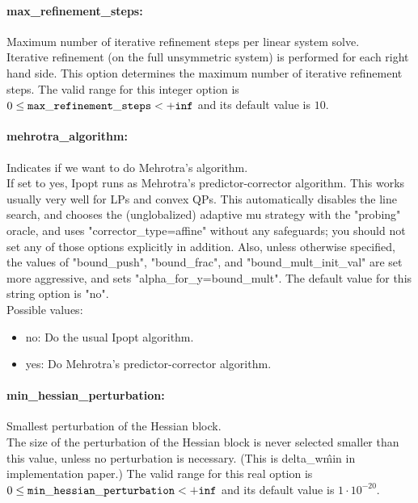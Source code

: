 \paragraph{max\_refinement\_steps:}\label{opt:max_refinement_steps} Maximum number of iterative refinement steps per linear system solve. \\
 Iterative refinement (on the full unsymmetric system) is performed for each right hand side.  This option determines the maximum number of iterative refinement steps. The valid range for this integer option is
$0 \le {\tt max\_refinement\_steps } <  {\tt +inf}$
and its default value is $10$.


\paragraph{mehrotra\_algorithm:}\label{opt:mehrotra_algorithm} Indicates if we want to do Mehrotra's algorithm. \\
 If set to yes, Ipopt runs as Mehrotra's predictor-corrector algorithm. This works usually very well for LPs and convex QPs.  This automatically disables the line search, and chooses the (unglobalized) adaptive mu strategy with the "probing" oracle, and uses "corrector\_type=affine" without any safeguards; you should not set any of those options explicitly in addition.  Also, unless otherwise specified, the values of "bound\_push", "bound\_frac", and "bound\_mult\_init\_val" are set more aggressive, and sets "alpha\_for\_y=bound\_mult". The default value for this string option is "no".
\\ 
Possible values:
\begin{itemize}
   \item no: Do the usual Ipopt algorithm.
   \item yes: Do Mehrotra's predictor-corrector algorithm.
\end{itemize}

\paragraph{min\_hessian\_perturbation:}\label{opt:min_hessian_perturbation} Smallest perturbation of the Hessian block. \\
 The size of the perturbation of the Hessian block is never selected smaller than this value, unless no perturbation is necessary. (This is delta\_w\^min in implementation paper.) The valid range for this real option is 
$0 \le {\tt min\_hessian\_perturbation } <  {\tt +inf}$
and its default value is $1 \cdot 10^{-20}$.


